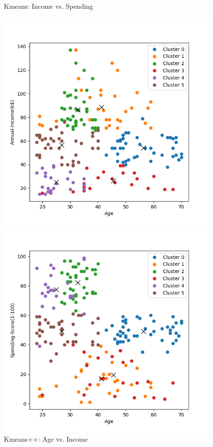 \documentclass[8pt]{article}
\begin{document}
\begin{figure}[H]
\begin{minipage}{0.32\textwidth}
        \caption{Kmeans: Income vs. Spending}
        \label{fig: Annual Income vs. Spending Score k6 rand14 com}
    \end{minipage}
    \hfill
    \begin{minipage}{0.32\textwidth}
        \centering
        \includegraphics[width=\textwidth]{./Prob4/out/task2_rand14/images/cluster_result_k6_0_1.png}
        \caption{Kmeans++: Age vs. Income}
        \label{fig: Age vs. Annual Income k6 pp com}
    \end{minipage}
    \hfill
    \begin{minipage}{0.32\textwidth}
        \centering
        \includegraphics[width=\textwidth]{./Prob4/out/task2_rand14/images/cluster_result_k6_0_2.png}

\end{minipage}
\end{figure}
\end{document}
